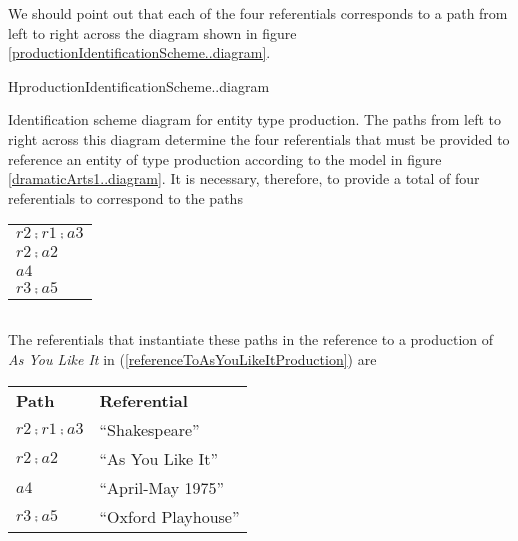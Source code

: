 \begin{worktt}
We should point out that each of the four referentials corresponds to a path from left to right across the  diagram shown in figure \ref{productionIdentificationScheme..diagram}.

\begin{erboxedFigure}{H}{productionIdentificationScheme..diagram}
{Identification scheme diagram for entity type production. 
The paths from left to right across this diagram determine the four referentials 
that must be provided to reference an entity of type production
according to the model in figure \ref{dramaticArts1..diagram}.
It is necessary, therefore,  to provide a total of four referentials
to correspond to the paths
\begin{center}
\begin{tabular}{p{3cm}}
$r2 \comp r1 \comp a3$ \\
$r2 \comp a2$ \\
$a4$          \\
$r3 \comp a5$ \\
\end{tabular}
\end{center}
}
 \begin{equation*}

\end{equation*}
\end{erboxedFigure}

The referentials that instantiate these paths in 
the reference to a production of 
\textit{As You Like It} in (\ref{referenceToAsYouLikeItProduction}) 
are\\
\newline
\begin{center}
\begin{tabular}{l l}
\textbf{Path}          & \textbf{Referential} \\
$r2 \comp r1 \comp a3$ & ``Shakespeare''       \\
$r2\comp a2$           & ``As You Like It''   \\
$a4$                   & ``April-May 1975''   \\
$r3 \comp a5$          & ``Oxford Playhouse''
\end{tabular}
\end{center}
\end{worktt}

